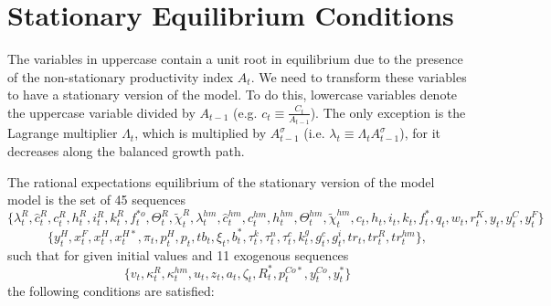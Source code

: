 \documentclass[12pt]{article}
\begin{document}
\clearpage
\newpage

\singlespacing


\clearpage
\appendix
\appendixpage
{}

\section{Stationary Equilibrium Conditions}
\label{Appendix:equations}


\renewcommand{\theequation}{A.\arabic{equation}} \setcounter{equation}{0}

The variables in uppercase contain a unit root in equilibrium due to the presence of the non-stationary productivity index $A_{t}$. We need to transform these variables to have a stationary version of the model. To do this, lowercase variables denote the uppercase variable divided by $A_{t-1}$ (e.g. $%
c_{t}\equiv \frac{C_{t}}{A_{t-1}}$). The only exception is the Lagrange multiplier $\Lambda _{t}$, which is multiplied by $A_{t-1}^{\sigma }$ (i.e. $\lambda _{t}\equiv \Lambda _{t}A_{t-1}^{\sigma }$), for it decreases along
the balanced growth path.

The rational expectations equilibrium of the stationary version of the model
model is the set of 45 sequences
\begin{equation*}
\{\lambda_{t}^R,\hat{c}_t^R,c_{t}^R,h_{t}^R,i_{t}^R,k_t^R, f_t^{*o},\Theta_t^R,\widetilde{\chi}_t^R, \lambda_{t}^{hm},
\hat{c}_t^{hm},c_{t}^{hm},h_{t}^{hm}, \Theta_t^{hm}, \widetilde{\chi}_t^{hm},c_{t},h_{t},i_{t},k_t,f^*_t,q_t, w_t, r_t^{K},y_{t},y_{t}^{C},y_{t}^{F}\}
\end{equation*}
\begin{equation*}
\{y_{t}^{H},x_{t}^{F},x_{t}^{H},x_{t}^{H\ast},\pi_t,p_{t}^{H},p_{t},tb_{t},\xi_t,b^*_t,\tau^k_t,\tau^n_t,\tau^c_t,k^g_t,g^c_t,g^i_t,tr_t,tr^R_t,tr^{hm}_t\},
\end{equation*} such that for given initial values and 11 exogenous sequences%
\begin{equation*}
\{v_t,\kappa^R _{t}, \kappa^{hm}_t,u_{t},z_{t},a_{t},\zeta _{t},R_{t}^{\ast },p_{t}^{Co\ast },y_{t}^{Co},y_{t}^{\ast }\}
\end{equation*}%
the following conditions are satisfied:%
\end{document}
